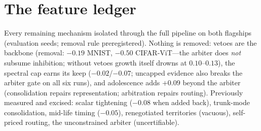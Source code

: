 \documentclass{article}
\begin{document}
\section{The feature ledger}\label{sec:ledger}
Every remaining mechanism isolated through the full pipeline on both
flagships (evaluation seeds; removal rule preregistered). Nothing is removed:
vetoes are the backbone (removal: $-0.19$ MNIST, $-0.50$ CIFAR-ViT---the
arbiter does \emph{not} subsume inhibition; without vetoes growth itself
drowns at $0.10$--$0.13$), the spectral cap earns its keep ($-0.02$/$-0.07$;
uncapped evidence also breaks the arbiter gate on all six runs), and
adolescence adds $+0.09$ beyond the arbiter (consolidation repairs
representation; arbitration repairs routing). Previously measured and
excised: scalar tightening ($-0.08$ when added back), trunk-mode
consolidation, mid-life timing ($-0.05$), renegotiated territories (vacuous),
self-priced routing, the unconstrained arbiter (uncertifiable).
\end{document}
